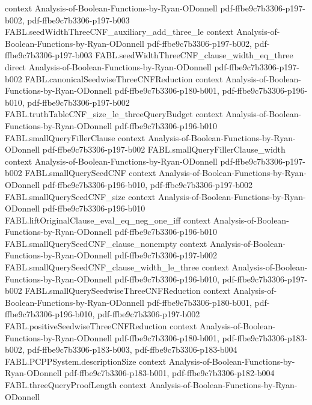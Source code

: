 \begin{theorem}
  {context}
  {Analysis-of-Boolean-Functions-by-Ryan-ODonnell}
  {pdf-ffbe9c7b3306-p197-b002,
    pdf-ffbe9c7b3306-p197-b003}
\proofstep
  {FABL.seedWidthThreeCNF_auxiliary_add_three_le}
  {context}
  {Analysis-of-Boolean-Functions-by-Ryan-ODonnell}
  {pdf-ffbe9c7b3306-p197-b002,
    pdf-ffbe9c7b3306-p197-b003}
\proofstep
  {FABL.seedWidthThreeCNF_clause_width_eq_three}
  {direct}
  {Analysis-of-Boolean-Functions-by-Ryan-ODonnell}
  {pdf-ffbe9c7b3306-p197-b002}
\proofstep
  {FABL.canonicalSeedwiseThreeCNFReduction}
  {context}
  {Analysis-of-Boolean-Functions-by-Ryan-ODonnell}
  {pdf-ffbe9c7b3306-p180-b001,
    pdf-ffbe9c7b3306-p196-b010,
    pdf-ffbe9c7b3306-p197-b002}
\proofstep
  {FABL.truthTableCNF_size_le_threeQueryBudget}
  {context}
  {Analysis-of-Boolean-Functions-by-Ryan-ODonnell}
  {pdf-ffbe9c7b3306-p196-b010}
\proofstep
  {FABL.smallQueryFillerClause}
  {context}
  {Analysis-of-Boolean-Functions-by-Ryan-ODonnell}
  {pdf-ffbe9c7b3306-p197-b002}
\proofstep
  {FABL.smallQueryFillerClause_width}
  {context}
  {Analysis-of-Boolean-Functions-by-Ryan-ODonnell}
  {pdf-ffbe9c7b3306-p197-b002}
\proofstep
  {FABL.smallQuerySeedCNF}
  {context}
  {Analysis-of-Boolean-Functions-by-Ryan-ODonnell}
  {pdf-ffbe9c7b3306-p196-b010,
    pdf-ffbe9c7b3306-p197-b002}
\proofstep
  {FABL.smallQuerySeedCNF_size}
  {context}
  {Analysis-of-Boolean-Functions-by-Ryan-ODonnell}
  {pdf-ffbe9c7b3306-p196-b010}
\proofstep
  {FABL.liftOriginalClause_eval_eq_neg_one_iff}
  {context}
  {Analysis-of-Boolean-Functions-by-Ryan-ODonnell}
  {pdf-ffbe9c7b3306-p196-b010}
\proofstep
  {FABL.smallQuerySeedCNF_clause_nonempty}
  {context}
  {Analysis-of-Boolean-Functions-by-Ryan-ODonnell}
  {pdf-ffbe9c7b3306-p197-b002}
\proofstep
  {FABL.smallQuerySeedCNF_clause_width_le_three}
  {context}
  {Analysis-of-Boolean-Functions-by-Ryan-ODonnell}
  {pdf-ffbe9c7b3306-p196-b010,
    pdf-ffbe9c7b3306-p197-b002}
\proofstep
  {FABL.smallQuerySeedwiseThreeCNFReduction}
  {context}
  {Analysis-of-Boolean-Functions-by-Ryan-ODonnell}
  {pdf-ffbe9c7b3306-p180-b001,
    pdf-ffbe9c7b3306-p196-b010,
    pdf-ffbe9c7b3306-p197-b002}
\proofstep
  {FABL.positiveSeedwiseThreeCNFReduction}
  {context}
  {Analysis-of-Boolean-Functions-by-Ryan-ODonnell}
  {pdf-ffbe9c7b3306-p180-b001,
    pdf-ffbe9c7b3306-p183-b002,
    pdf-ffbe9c7b3306-p183-b003,
    pdf-ffbe9c7b3306-p183-b004}
\proofstep
  {FABL.PCPPSystem.descriptionSize}
  {context}
  {Analysis-of-Boolean-Functions-by-Ryan-ODonnell}
  {pdf-ffbe9c7b3306-p183-b001,
    pdf-ffbe9c7b3306-p182-b004}
\proofstep
  {FABL.threeQueryProofLength}
  {context}
  {Analysis-of-Boolean-Functions-by-Ryan-ODonnell}

\end{theorem}
